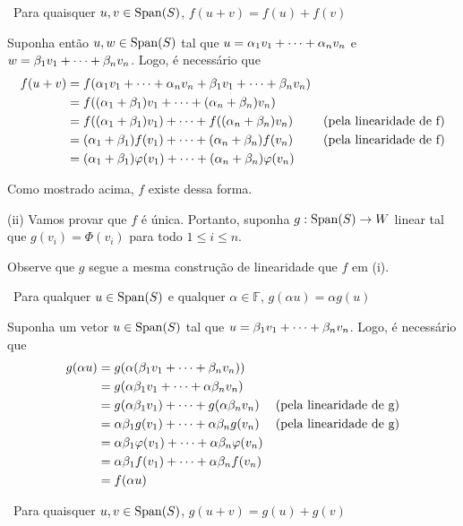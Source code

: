 \documentclass[11pt,reqno,a4paper]{amsart}
\begin{document}
\textbullet\ Para quaisquer $u,v \in \mathrm{Span}(S)$, $f(u + v) = f(u) + f(v)$

Suponha então $u,w \in \mathrm{Span}(S)$ tal que $u = \comblin$ e $w = \comblin[\beta]$. Logo, é necessário que
\begin{align*}
    f(u+v) &= f(\comblin + \comblin[\beta])\\
    &= f((\alpha_1 + \beta_1) v_1 + \dots + (\alpha_n + \beta_n) v_n)\\
    &= f((\alpha_1 + \beta_1) v_1) + \dots + f((\alpha_n + \beta_n) v_n) &\text{(pela linearidade de f)}\\
    &= (\alpha_1 + \beta_1) f(v_1) + \dots + (\alpha_n + \beta_n) f(v_n) &\text{(pela linearidade de f)}\\
    &= (\alpha_1 + \beta_1) \varphi (v_1) + \dots + (\alpha_n + \beta_n) \varphi (v_n)
\end{align*}

Como mostrado acima, $f$ existe dessa forma.

\hrulefill

(ii) Vamos provar que $f$ é única. Portanto, suponha $g: \mathrm{Span}(S) \to W$ linear tal que $g(v_i) = \varPhi (v_i)$ para todo $1 \leq i \leq n$.

Observe que $g$ segue a mesma construção de linearidade que $f$ em (i).

\pagebreak

\textbullet\ Para qualquer $u \in \mathrm{Span}(S)$ e qualquer $\alpha \in \mathbb{F}$, $g(\alpha u) = \alpha g(u)$

Suponha um vetor $u \in \mathrm{Span}(S)$ tal que $u = \comblin[\beta]$. Logo, é necessário que
\begin{align*}
    g(\alpha u) &= g(\alpha(\comblin[\beta]))\\
    &= g(\comblin[\alpha \beta])\\
    &= g(\alpha \beta_1 v_1) + \dots + g(\alpha \beta_n v_n) &\text{(pela linearidade de g)}\\
    &= \alpha \beta_1 g(v_1) + \dots + \alpha \beta_n g( v_n) &\text{(pela linearidade de g)}\\
    &= \alpha \beta_1 \varphi (v_1) + \dots + \alpha \beta_n \varphi (v_n)\\
    &= \alpha \beta_1 f(v_1) + \dots + \alpha \beta_n f( v_n)\\
    &= f(\alpha u)
\end{align*}

\medskip

\textbullet\ Para quaisquer $u,v \in \mathrm{Span}(S)$, $g(u + v) = g(u) + g(v)$
\end{document}
